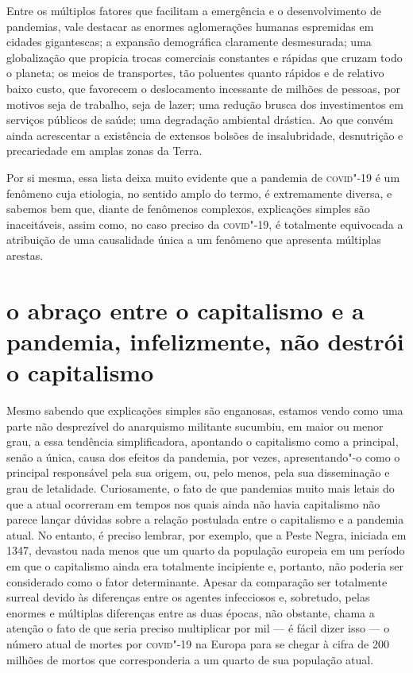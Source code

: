 Entre os múltiplos fatores que facilitam a emergência e o
desenvolvimento de pandemias, vale destacar as enormes aglomerações
humanas espremidas em cidades gigantescas; a expansão demográfica
claramente desmesurada; uma globalização que propicia trocas comerciais
constantes e rápidas que cruzam todo o planeta; os meios de transportes,
tão poluentes quanto rápidos e de relativo baixo custo, que favorecem o
deslocamento incessante de milhões de pessoas, por motivos seja de
trabalho, seja de lazer; uma redução brusca dos investimentos em
serviços públicos de saúde; uma degradação ambiental drástica. Ao que
convém ainda acrescentar a existência de extensos bolsões de
insalubridade, desnutrição e precariedade em amplas zonas da Terra.

Por si mesma, essa lista deixa muito evidente que a pandemia de \textsc{covid}"-19
é um fenômeno cuja etiologia, no sentido amplo do termo, é extremamente
diversa, e sabemos bem que, diante de fenômenos complexos, explicações
simples são inaceitáveis, assim como, no caso preciso da \textsc{covid}"-19, é
totalmente equivocada a atribuição de uma causalidade única a um
fenômeno que apresenta múltiplas arestas.

\section{o abraço entre o capitalismo e a pandemia, infelizmente, não
destrói o capitalismo}

Mesmo sabendo que explicações simples são enganosas, estamos vendo como
uma parte não desprezível do anarquismo militante sucumbiu, em maior ou
menor grau, a essa tendência simplificadora, apontando o capitalismo
como a principal, senão a única, causa dos efeitos da pandemia, por
vezes, apresentando"-o como o principal responsável pela sua origem, ou,
pelo menos, pela sua disseminação e grau de letalidade. Curiosamente, o
fato de que pandemias muito mais letais do que a atual ocorreram em
tempos nos quais ainda não havia capitalismo não parece lançar dúvidas
sobre a relação postulada entre o capitalismo e a pandemia atual. No
entanto, é preciso lembrar, por exemplo, que a Peste Negra, iniciada em
1347, devastou nada menos que um quarto da população europeia em um
período em que o capitalismo ainda era totalmente incipiente e,
portanto, não poderia ser considerado como o fator determinante. Apesar
da comparação ser totalmente surreal devido às diferenças entre os
agentes infecciosos e, sobretudo, pelas enormes e múltiplas diferenças
entre as duas épocas, não obstante, chama a atenção o fato de que seria
preciso multiplicar por mil --- é fácil dizer isso --- o número atual de
mortes por \textsc{covid}"-19 na Europa para se chegar à cifra de 200 milhões de
mortos que corresponderia a um quarto de sua população atual.

